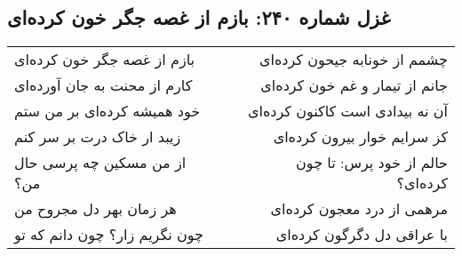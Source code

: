 \begin{center}
\section*{غزل شماره ۲۴۰: بازم از غصه جگر خون کرده‌ای}
\label{sec:240}
\begin{longtable}{l p{0.5cm} r}
بازم از غصه جگر خون کرده‌ای
&&
چشمم از خونابه جیحون کرده‌ای
\\
کارم از محنت به جان آورده‌ای
&&
جانم از تیمار و غم خون کرده‌ای
\\
خود همیشه کرده‌ای بر من ستم
&&
آن نه بیدادی است کاکنون کرده‌ای
\\
زیبد ار خاک درت بر سر کنم
&&
کز سرایم خوار بیرون کرده‌ای
\\
از من مسکین چه پرسی حال من؟
&&
حالم از خود پرس: تا چون کرده‌ای؟
\\
هر زمان بهر دل مجروح من
&&
مرهمی از درد معجون کرده‌ای
\\
چون نگریم زار؟ چون دانم که تو
&&
با عراقی دل دگرگون کرده‌ای
\\
\end{longtable}
\end{center}
